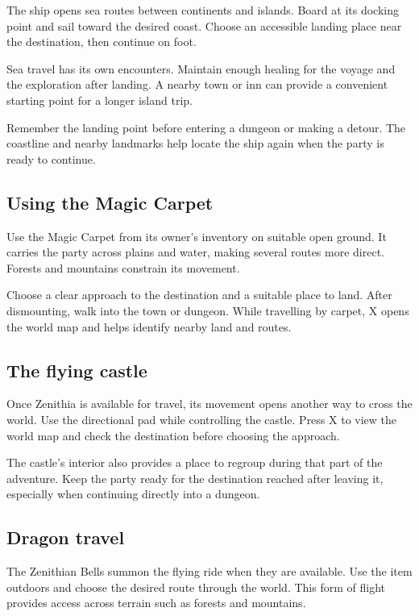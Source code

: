 The ship opens sea routes between continents and islands. Board at its
docking point and sail toward the desired coast. Choose an accessible
landing place near the destination, then continue on foot.

Sea travel has its own encounters. Maintain enough healing for the voyage
and the exploration after landing. A nearby town or inn can provide a
convenient starting point for a longer island trip.

Remember the landing point before entering a dungeon or making a detour.
The coastline and nearby landmarks help locate the ship again when the
party is ready to continue.

\subsection*{Using the Magic Carpet}

Use the Magic Carpet from its owner's inventory on suitable open ground.
It carries the party across plains and water, making several routes more
direct. Forests and mountains constrain its movement.

Choose a clear approach to the destination and a suitable place to land.
After dismounting, walk into the town or dungeon. While travelling by
carpet, X opens the world map and helps identify nearby land and routes.

\subsection*{The flying castle}

Once Zenithia is available for travel, its movement opens another way to
cross the world. Use the directional pad while controlling the castle.
Press X to view the world map and check the destination before choosing
the approach.

The castle's interior also provides a place to regroup during that part
of the adventure. Keep the party ready for the destination reached after
leaving it, especially when continuing directly into a dungeon.

\subsection*{Dragon travel}

The Zenithian Bells summon the flying ride when they are available.
Use the item outdoors and choose the desired route through the world.
This form of flight provides access across terrain such as forests and
mountains.

